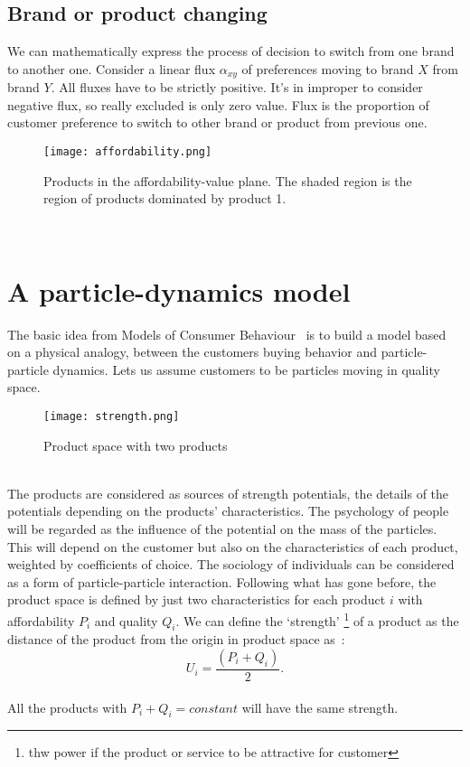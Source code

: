 \subsection{Brand or product changing} \label{subsec:brand}
We can mathematically express the process of decision to switch from one brand to another one.
Consider a linear flux $\alpha_{xy}$ of preferences moving to brand $X$ from brand $Y$.
All fluxes have to be strictly positive.
It's in improper to consider negative flux, so really excluded is only zero value.
Flux is the proportion of customer preference to switch to other brand or product from previous one.
\begin{figure}[h!]
	\begin{center}
		\texttt{[image: affordability.png]}
	\end{center}
	\caption{Products in the affordability-value plane.
	The shaded region is the region of products dominated by product 1.}
	\label{Affordability of products~\cite{pantland}}
\end{figure}
\\
\section{A particle-dynamics model} \label{sec:dynamic}
The basic idea from Models of Consumer Behaviour~\cite{patel} is to build a model based on a physical analogy, between the customers buying behavior
and particle-particle dynamics.
Lets us assume customers to be particles moving in quality space.
\begin{figure}[h!]
	\begin{center}
		\texttt{[image: strength.png]}
	\end{center}
	\caption{Product space with two products}
	\label{Strength of products~\cite{patel}}
\end{figure}
\\
The products are considered as sources of strength potentials, the details of the potentials depending on the products’ characteristics.
The psychology of people will be regarded as the influence of the potential on the mass of the particles.
This will depend on the customer but also on the characteristics of each product, weighted by coefficients of choice.
The sociology of individuals can be considered as a form of particle-particle interaction.
Following what has gone before, the product space is defined by just two characteristics for each product $i$ with affordability $P_i$ and quality $Q_i$.
We can define the ‘strength’ \footnote{ thw power if the product or service to be attractive for customer} of a product as the distance
of the product from the origin in product space as~\cite{pantland}:
\\
\begin{equation} \label{eq:10}
U_i = \frac{(P_i + Q_i)}{2}.
\end{equation}
\\
All the products with $P_i + Q_i = constant$ will have the same strength.

